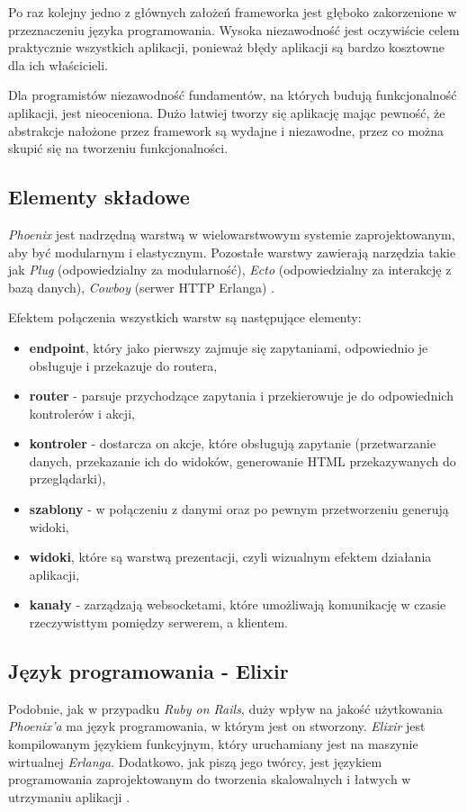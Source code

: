 Po raz kolejny jedno z głównych założeń frameworka jest głęboko zakorzenione w przeznaczeniu języka programowania. Wysoka niezawodność jest oczywiście celem praktycznie wszystkich aplikacji, ponieważ błędy aplikacji są bardzo kosztowne dla ich właścicieli.

Dla programistów niezawodność fundamentów, na których budują funkcjonalność aplikacji, jest nieoceniona. Dużo łatwiej tworzy się aplikację mając pewność, że abstrakcje nałożone przez framework są wydajne i niezawodne, przez co można skupić się na tworzeniu funkcjonalności.

\subsection{Elementy składowe}
\textit{Phoenix} jest nadrzędną warstwą w wielowarstwowym systemie zaprojektowanym, aby być modularnym i elastycznym. Pozostałe warstwy zawierają narzędzia takie jak \textit{Plug} (odpowiedzialny za modularność), \textit{Ecto} (odpowiedzialny za interakcję z bazą danych), \textit{Cowboy} (serwer HTTP Erlanga) \cite{phoenix_docs}.

Efektem połączenia wszystkich warstw są następujące elementy:
\begin{itemize}
  \item \textbf{endpoint}, który jako pierwszy zajmuje się zapytaniami, odpowiednio je obsługuje i przekazuje do routera,
  \item \textbf{router} - parsuje przychodzące zapytania i przekierowuje je do odpowiednich kontrolerów i akcji,
  \item \textbf{kontroler} - dostarcza on akcje, które obsługują zapytanie (przetwarzanie danych, przekazanie ich do widoków, generowanie HTML przekazywanych do przeglądarki),
  \item \textbf{szablony} - w połączeniu z danymi oraz po pewnym przetworzeniu generują widoki,
  \item \textbf{widoki}, które są warstwą prezentacji, czyli wizualnym efektem działania aplikacji,
  \item \textbf{kanały} - zarządzają websocketami, które umożliwają komunikację w czasie rzeczywisttym pomiędzy serwerem, a klientem.
\end{itemize}

\subsection{Język programowania - Elixir} %
\label{phoenix:elixir}
Podobnie, jak w przypadku \textit{Ruby on Rails}, duży wpływ na jakość użytkowania \textit{Phoenix'a} ma język programowania, w którym jest on stworzony. \textit{Elixir} jest kompilowanym językiem funkcyjnym, który uruchamiany jest na maszynie wirtualnej \textit{Erlanga}. Dodatkowo, jak piszą jego twórcy, jest językiem programowania zaprojektowanym do tworzenia skalowalnych i łatwych w utrzymaniu aplikacji \cite{elixir}.

